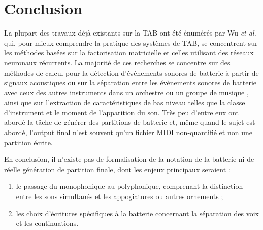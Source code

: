 \section*{Conclusion}
La plupart des travaux déjà existants sur la TAB ont été énumérés par Wu
\textit{et al.} \cite{Review_ADT} qui, pour mieux comprendre la pratique des
systèmes de TAB, se concentrent sur les méthodes basées sur la factorisation
matricielle et celles utilisant des réseaux neuronaux récurrents. La majorité
de ces recherches se concentre sur des méthodes de calcul pour la détection
d'événements sonores de batterie à partir de signaux acoustiques ou sur la
séparation entre les évènements sonores de batterie avec ceux des autres
instruments dans un orchestre ou un groupe de musique \cite{2802}, ainsi que
sur l'extraction de caractéristiques de bas niveau telles que la classe
d'instrument et le moment de l'apparition du son. Très peu d'entre eux ont
abordé la tâche de générer des partitions de batterie et, même quand le sujet
est abordé, l’output final n’est souvent qu’un fichier MIDI non-quantifié et
non une partition écrite.

En conclusion, il n’existe pas de formalisation de la notation de la batterie
ni de réelle génération de partition finale, dont les enjeux principaux
seraient :
\begin{enumerate}
    \item le passage du monophonique au polyphonique, comprenant la distinction
        entre les sons simultanés et les appogiatures ou autres ornements ;
    \item les choix d’écritures spécifiques à la batterie concernant la
        séparation des voix et les continuations.
\end{enumerate}

